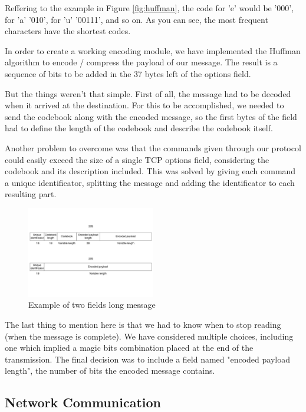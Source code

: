 Reffering to the example in Figure \ref{fig:huffman}, the code for 'e' would
be '000', for 'a' '010', for 'u' '00111', and so on. As you can see, the most
frequent characters have the shortest codes.

In order to create a working encoding module, we have implemented the Huffman
algorithm to encode / compress the payload of our message. The result is a
sequence of bits to be added in the 37 bytes left of the options field.

But the things weren't that simple. First of all, the message had to be decoded
when it arrived at the destination. For this to be accomplished, we needed to
send the codebook along with the encoded message, so the first bytes of the
field had to define the length of the codebook and describe the codebook itself.

Another problem to overcome was that the commands given through our protocol
could easily exceed the size of a single TCP options field, considering the
codebook and its description included. This was solved by giving each command
a unique identificator, splitting the message and adding the identificator to
each resulting part.

\begin{figure}
  \centering
  \includegraphics[width=0.5\textwidth]{img/encoded}
  \caption{Example of two fields long message}
  \label{fig:encoded}
\end{figure}

The last thing to mention here is that we had to know when to stop reading
(when the message is complete). We have considered multiple choices, including
one which implied a magic bits combination placed at the end of the transmission.
The final decision was to include a field named "encoded payload length", the
number of bits the encoded message contains.

\subsection{Network Communication}

